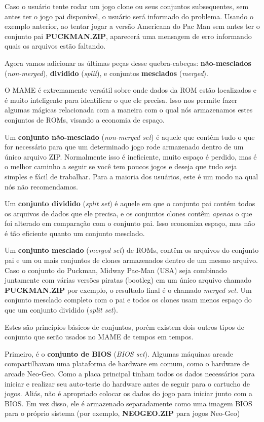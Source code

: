 \documentclass[letterpaper,10pt,brazil]{sphinxmanual}
\begin{document}
Caso o usuário tente rodar um jogo clone ou seus conjuntos subsequentes,
sem antes ter o jogo pai disponível, o usuário será informado do
problema. Usando o exemplo anterior, ao tentar jogar a versão Americana
do Pac Man sem antes ter o conjunto pai \textbf{PUCKMAN.ZIP}, aparecerá uma
mensagem de erro informando quais os arquivos estão faltando.

Agora vamos adicionar as últimas peças desse quebra-cabeças:
\textbf{não-mesclados} (\emph{non-merged}), \textbf{dividido} (\emph{split}), e conjuntos
\textbf{mesclados} (\emph{merged}).

O MAME é extremamente versátil sobre onde dados da ROM estão localizados
e é muito inteligente para identificar o que ele precisa. Isso nos
permite fazer algumas mágicas relacionada com a maneira com o qual nós
armazenamos estes conjuntos de ROMs, visando a economia de espaço.

Um \textbf{conjunto não-mesclado} (\emph{non-merged set}) é aquele que contém tudo
o que for necessário para que um determinado jogo rode armazenado dentro
de um único arquivo ZIP. Normalmente isso é ineficiente, muito espaço é
perdido, mas é o melhor caminho a seguir se você tem poucos jogos e
deseja que tudo seja simples e fácil de trabalhar.
Para a maioria dos usuários, este é um modo na qual nós não
recomendamos.

Um \textbf{conjunto dividido} (\emph{split set}) é aquele em que o conjunto pai
contém todos os arquivos de dados que ele precisa, e os conjuntos clones
contêm \emph{apenas} o que foi alterado em comparação com o conjunto pai.
Isso economiza espaço, mas não é tão eficiente quanto um conjunto
mesclado.

Um \textbf{conjunto mesclado} (\emph{merged set}) de ROMs, contêm os arquivos do
conjunto pai e um ou mais conjuntos de clones armazenados dentro de um
mesmo arquivo. Caso o conjunto do Puckman, Midway Pac-Man (USA) seja
combinado juntamente com várias versões piratas (bootleg) em um único
arquivo chamado \textbf{PUCKMAN.ZIP} por exemplo, o resultado final é o
chamado \emph{merged set}. Um conjunto mesclado completo com o pai e todos
os clones usam menos espaço do que um conjunto dividido (\emph{split set}).

Estes são princípios básicos de conjuntos, porém existem dois outros
tipos de conjunto que serão usados no MAME de tempos em tempos.

Primeiro, é o \textbf{conjunto de BIOS} (\emph{BIOS set}).
Algumas máquinas arcade compartilhavam uma plataforma de hardware em
comum, como o hardware de arcade Neo-Geo. Como a placa principal tinham
todos os dados necessários para iniciar e realizar seu auto-teste do
hardware antes de seguir para o cartucho de jogos. Aliás, não é
apropriado colocar os dados do jogo para iniciar junto com a BIOS.
Em vez disso, ele é armazenado separadamente como uma imagem BIOS para o
próprio sistema (por exemplo, \textbf{NEOGEO.ZIP} para jogos Neo-Geo)
\end{document}
